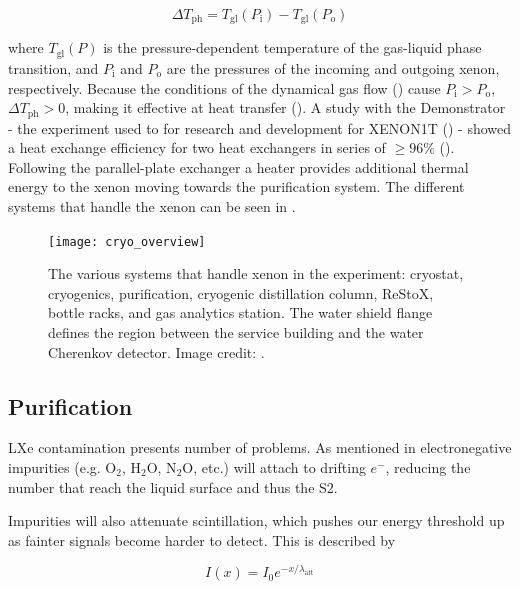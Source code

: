 \begin{equation}
\Delta T_{\mathrm{ph}} = T_{\mathrm{gl}} (P_{\mathrm{i}}) - T_{\mathrm{gl}} (P_{\mathrm{o}})
\label{eq:xenon1t_cryo_latent}
\end{equation}

\noindent where $T_{\mathrm{gl}} (P)$ is the pressure-dependent temperature of the gas-liquid phase transition, and $P_{\mathrm{i}}$ and
$P_{\mathrm{o}}$
are the pressures of the incoming and outgoing xenon, respectively.  Because the conditions of the dynamical gas flow
() cause $P_{\mathrm{i}} > P_{\mathrm{o}}$, $\Delta T_{\mathrm{ph}} > 0$, making it effective at heat transfer
().  A study with the Demonstrator - the
experiment used to for research and development for XENON1T () - showed a heat
exchange efficiency for
two heat exchangers in series of $\geq 96\%$ ().  Following the parallel-plate exchanger a heater provides additional
thermal energy to the xenon moving towards the purification system.  The different systems that handle the xenon can be seen in
.

\begin{figure}
\centering
\texttt{[image: cryo\_overview]}
\caption{The various systems that handle xenon in the experiment: cryostat, cryogenics, purification, cryogenic distillation column,
ReStoX, bottle racks, and gas analytics station.  The water shield flange defines the region between the service building and the water
Cherenkov detector.  Image credit: .}
\label{fig:xenon1t_cryo_overview}
\end{figure}



\subsection{Purification}
\label{subsec:xenon1t_pur}
LXe contamination presents number of problems.  As mentioned in  electronegative
impurities (e.g. O$_2$, H$_2$O, N$_2$O, etc.) will attach to drifting $e^-$, reducing the number that reach
the liquid surface and thus the S2.

Impurities will also attenuate scintillation, which pushes our energy threshold up as fainter signals become harder to detect.  This is
described by

\begin{equation}
I(x) = I_0 e^{-x / \lambda_{\mathrm{att}}}
\label{eq:xenon1t_pur_atten}
\end{equation}

